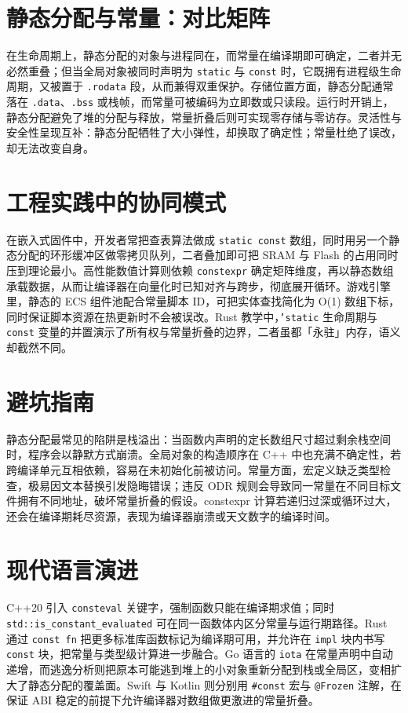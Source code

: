\chapter{静态分配与常量：对比矩阵}
在生命周期上，静态分配的对象与进程同在，而常量在编译期即可确定，二者并无必然重叠；但当全局对象被同时声明为 \texttt{static} 与 \texttt{const} 时，它既拥有进程级生命周期，又被置于 \texttt{.rodata} 段，从而兼得双重保护。存储位置方面，静态分配通常落在 \texttt{.data}、\texttt{.bss} 或栈帧，而常量可被编码为立即数或只读段。运行时开销上，静态分配避免了堆的分配与释放，常量折叠后则可实现零存储与零访存。灵活性与安全性呈现互补：静态分配牺牲了大小弹性，却换取了确定性；常量杜绝了误改，却无法改变自身。\par
\chapter{工程实践中的协同模式}
在嵌入式固件中，开发者常把查表算法做成 \texttt{static const} 数组，同时用另一个静态分配的环形缓冲区做零拷贝队列，二者叠加即可把 SRAM 与 Flash 的占用同时压到理论最小。高性能数值计算则依赖 \texttt{constexpr} 确定矩阵维度，再以静态数组承载数据，从而让编译器在向量化时已知对齐与跨步，彻底展开循环。游戏引擎里，静态的 ECS 组件池配合常量脚本 ID，可把实体查找简化为 O(1) 数组下标，同时保证脚本资源在热更新时不会被误改。Rust 教学中，\texttt{'static} 生命周期与 \texttt{const} 变量的并置演示了所有权与常量折叠的边界，二者虽都「永驻」内存，语义却截然不同。\par
\chapter{避坑指南}
静态分配最常见的陷阱是栈溢出：当函数内声明的定长数组尺寸超过剩余栈空间时，程序会以静默方式崩溃。全局对象的构造顺序在 C++ 中也充满不确定性，若跨编译单元互相依赖，容易在未初始化前被访问。常量方面，宏定义缺乏类型检查，极易因文本替换引发隐晦错误；违反 ODR 规则会导致同一常量在不同目标文件拥有不同地址，破坏常量折叠的假设。constexpr 计算若递归过深或循环过大，还会在编译期耗尽资源，表现为编译器崩溃或天文数字的编译时间。\par
\chapter{现代语言演进}
C++20 引入 \texttt{consteval} 关键字，强制函数只能在编译期求值；同时 \texttt{std::is\_{}constant\_{}evaluated} 可在同一函数体内区分常量与运行期路径。Rust 通过 \texttt{const fn} 把更多标准库函数标记为编译期可用，并允许在 \texttt{impl} 块内书写 \texttt{const} 块，把常量与类型级计算进一步融合。Go 语言的 \texttt{iota} 在常量声明中自动递增，而逃逸分析则把原本可能逃到堆上的小对象重新分配到栈或全局区，变相扩大了静态分配的覆盖面。Swift 与 Kotlin 则分别用 \texttt{\#{}const} 宏与 \texttt{@Frozen} 注解，在保证 ABI 稳定的前提下允许编译器对数组做更激进的常量折叠。\par
